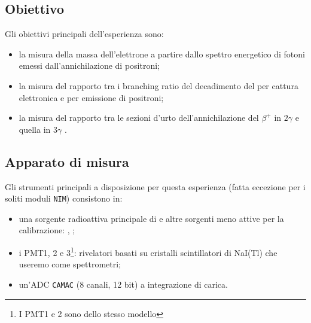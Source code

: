 \subsection{Obiettivo}
Gli obiettivi principali dell'esperienza sono:
\begin{itemize}
	\item la misura della massa dell'elettrone a partire dallo spettro energetico di fotoni emessi dall'annichilazione di positroni;
	\item la misura del rapporto tra i branching ratio del decadimento del  \na\; per cattura elettronica e per emissione di positroni;
	\item la misura del rapporto tra le sezioni d'urto dell'annichilazione del $\beta^+$ in $2\gamma$ e quella in $3\gamma$ .
\end{itemize}

\subsection{Apparato di misura}
Gli strumenti principali a disposizione per questa esperienza (fatta eccezione per i soliti moduli \texttt{NIM}) consistono in:
\begin{itemize}
	\item una sorgente radioattiva principale di \na\; e altre sorgenti meno attive per la calibrazione: \cs\;, \co\;;
	\item i PMT1, 2 e 3\footnote{I PMT1 e 2 sono dello stesso modello}: rivelatori basati su cristalli scintillatori di NaI(Tl) che useremo come spettrometri;
	\item un'ADC \texttt{CAMAC} (8 canali, 12 bit) a integrazione di carica.
\end{itemize}


